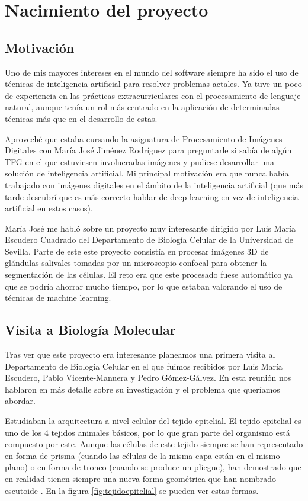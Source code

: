 \chapter{Nacimiento del proyecto}\label{nacimiento}
\section{Motivaci\'on}\label{motivacion}

Uno de mis mayores intereses en el mundo del software siempre ha sido el uso de técnicas de inteligencia artificial para resolver problemas actales. Ya tuve un poco de experiencia en las prácticas extracurriculares con el procesamiento de lenguaje natural, aunque tenía un rol más centrado en la aplicación de determinadas técnicas más que en el desarrollo de estas.

Aproveché que estaba cursando la asignatura de Procesamiento de Imágenes Digitales con María José Jiménez Rodríguez para preguntarle si sabía de algún TFG en el que estuviesen involucradas imágenes y pudiese desarrollar una solución de inteligencia artificial. Mi principal motivación era que nunca había trabajado con imágenes digitales en el ámbito de la inteligencia artificial (que más tarde descubrí que es más correcto hablar de deep learning en vez de inteligencia artificial en estos casos).

María José me habló sobre un proyecto muy interesante dirigido por Luis María Escudero Cuadrado del Departamento de Biología Celular de la Universidad de Sevilla. Parte de este este proyecto consistía en procesar imágenes 3D de glándulas salivales tomadas por un microscopio confocal para obtener la segmentación de las células. El reto era que este procesado fuese automático ya que se podría ahorrar mucho tiempo, por lo que estaban valorando el uso de técnicas de machine learning.

\section{Visita a Biolog\'ia Molecular}\label{visita}

Tras ver que este proyecto era interesante planeamos una primera visita al Departamento de Biología Celular en el que fuimos recibidos por Luis María Escudero, Pablo Vicente-Manuera y Pedro Gómez-Gálvez. En esta reunión nos hablaron en más detalle sobre su investigación y el problema que queríamos abordar.

Estudiaban la arquitectura a nivel celular del tejido epitelial. El tejido epitelial es uno de los 4 tejidos animales básicos, por lo que gran parte del organismo está compuesto por este. Aunque las células de este tejido siempre se han representado en forma de prisma (cuando las células de la misma capa están en el mismo plano) o en forma de tronco (cuando se produce un pliegue), han demostrado que en realidad tienen siempre una nueva forma geométrica que han nombrado escutoide \cite{GomezGalvez2018}. En la figura \ref{fig:tejidoepitelial} \cite{GomezGalvez2018} se pueden ver estas formas.

